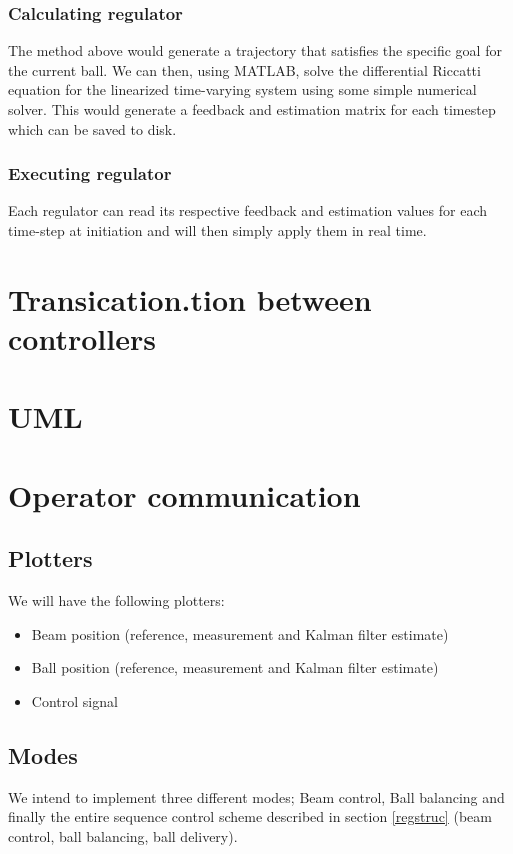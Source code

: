 \documentclass{article}
\begin{document}
\subsubsection{Calculating regulator}
The method above would generate a trajectory that satisfies the specific goal for the current ball. We can then, using MATLAB, solve the differential Riccatti equation for the linearized time-varying system using some simple numerical solver. This would generate a feedback and estimation matrix for each timestep which can be saved to disk.
\subsubsection{Executing regulator}
Each regulator can read its respective feedback and estimation values for each time-step at initiation and will then simply apply them in real time.

\section{Transication.tion between controllers}


\section{UML}


\section{Operator communication}
\subsection{Plotters}
We will have the following plotters:
\begin{itemize}
\item Beam position (reference, measurement and Kalman filter estimate)
\item Ball position (reference, measurement and Kalman filter estimate)
\item Control signal
\end{itemize}

\subsection{Modes}
We intend to implement three different modes; Beam control, Ball balancing and finally the entire sequence control scheme described in section \ref{regstruc} (beam control, ball balancing, ball delivery).
\end{document}
